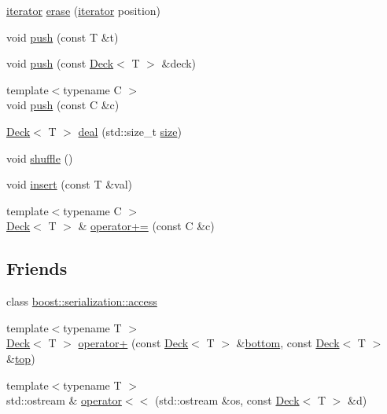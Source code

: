 \begin{DoxyCompactItemize}
\item 
\hyperlink{classpan_1_1detail_1_1_deck_a8b4adeae73d035d2bbe3fdfcb65ed1b1}{iterator} \hyperlink{classpan_1_1detail_1_1_deck_ade33e6822a72ec2031def23a7a4d6cfc}{erase} (\hyperlink{classpan_1_1detail_1_1_deck_a8b4adeae73d035d2bbe3fdfcb65ed1b1}{iterator} position)
\item 
void \hyperlink{classpan_1_1detail_1_1_deck_a540b0f1829a2783f76dcda346871ec19}{push} (const T \&t)
\item 
void \hyperlink{classpan_1_1detail_1_1_deck_a27a12aa62ddf019a33922fc8c78425b2}{push} (const \hyperlink{classpan_1_1detail_1_1_deck}{Deck}$<$ T $>$ \&deck)
\item 
{\footnotesize template$<$typename C $>$ }\\void \hyperlink{classpan_1_1detail_1_1_deck_aa0bb14b1318470b4c84d02a8f531242d}{push} (const C \&c)
\item 
\hyperlink{classpan_1_1detail_1_1_deck}{Deck}$<$ T $>$ \hyperlink{classpan_1_1detail_1_1_deck_a2b430f618af32aa3c3d5fff16133ebda}{deal} (std\+::size\+\_\+t \hyperlink{classpan_1_1detail_1_1_deck_a4ccde71b3fae9ce2ea3da99ad500c9ba}{size})
\item 
void \hyperlink{classpan_1_1detail_1_1_deck_af6f9182fc5bb8c77f50ebd9a3a3a3606}{shuffle} ()
\item 
void \hyperlink{classpan_1_1detail_1_1_deck_a51a44400a7614735bcb5e560ea48da48}{insert} (const T \&val)
\item 
{\footnotesize template$<$typename C $>$ }\\\hyperlink{classpan_1_1detail_1_1_deck}{Deck}$<$ T $>$ \& \hyperlink{classpan_1_1detail_1_1_deck_af541a86b4d96c99ca748a80a4ccf4196}{operator+=} (const C \&c)
\end{DoxyCompactItemize}
\subsection*{Friends}
\begin{DoxyCompactItemize}
\item 
class \hyperlink{classpan_1_1detail_1_1_deck_ac98d07dd8f7b70e16ccb9a01abf56b9c}{boost\+::serialization\+::access}
\item 
{\footnotesize template$<$typename T $>$ }\\\hyperlink{classpan_1_1detail_1_1_deck}{Deck}$<$ T $>$ \hyperlink{classpan_1_1detail_1_1_deck_a6a019fd327e92f2f97cb25e9efdf95e2}{operator+} (const \hyperlink{classpan_1_1detail_1_1_deck}{Deck}$<$ T $>$ \&\hyperlink{classpan_1_1detail_1_1_deck_a44054712651d2f78a7c6c238be9dbdcb}{bottom}, const \hyperlink{classpan_1_1detail_1_1_deck}{Deck}$<$ T $>$ \&\hyperlink{classpan_1_1detail_1_1_deck_a12ce80897ff102e94279a81584b29e2d}{top})
\item 
{\footnotesize template$<$typename T $>$ }\\std\+::ostream \& \hyperlink{classpan_1_1detail_1_1_deck_ab8b4a9b9c08e387099a284faf9b15281}{operator$<$$<$} (std\+::ostream \&os, const \hyperlink{classpan_1_1detail_1_1_deck}{Deck}$<$ T $>$ \&d)
\end{DoxyCompactItemize}


